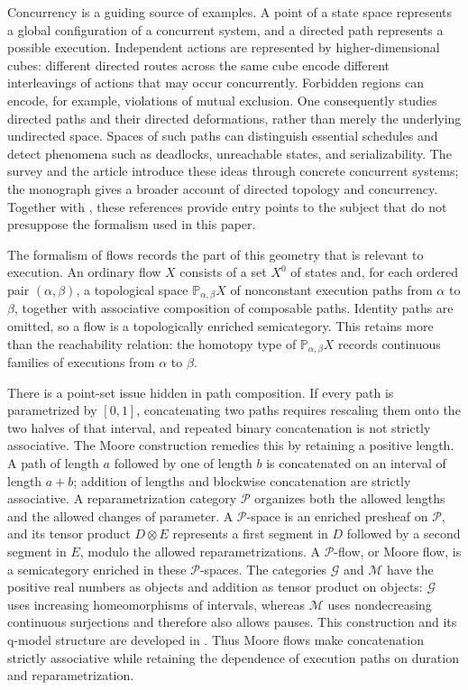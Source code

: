 \documentclass[12pt,a4paper]{amsart}
\newcommand{\Pcat}{\mathcal P}
\newcommand{\G}{\mathcal G}
\newcommand{\M}{\mathcal M}
\theoremstyle{definition}
\begin{document}
Concurrency is a guiding source of examples. A point of a state space represents a global configuration of a concurrent system, and a directed path represents a possible execution. Independent actions are represented by higher-dimensional cubes: different directed routes across the same cube encode different interleavings of actions that may occur concurrently. Forbidden regions can encode, for example, violations of mutual exclusion. One consequently studies directed paths and their directed deformations, rather than merely the underlying undirected space. Spaces of such paths can distinguish essential schedules and detect phenomena such as deadlocks, unreachable states, and serializability. The survey \cite{GoubaultUserGuide} and the article \cite{FajstrupRaussenGoubault} introduce these ideas through concrete concurrent systems; the monograph \cite{DAT_book} gives a broader account of directed topology and concurrency. Together with \cite{Grandis}, these references provide entry points to the subject that do not presuppose the formalism used in this paper.

The formalism of flows records the part of this geometry that is relevant to execution. An ordinary flow \(X\) consists of a set \(X^0\) of states and, for each ordered pair \((\alpha,\beta)\), a topological space \(\mathbb P_{\alpha,\beta}X\) of nonconstant execution paths from \(\alpha\) to \(\beta\), together with associative composition of composable paths. Identity paths are omitted, so a flow is a topologically enriched semicategory. This retains more than the reachability relation: the homotopy type of \(\mathbb P_{\alpha,\beta}X\) records continuous families of executions from \(\alpha\) to \(\beta\).

There is a point-set issue hidden in path composition. If every path is parametrized by \([0,1]\), concatenating two paths requires rescaling them onto the two halves of that interval, and repeated binary concatenation is not strictly associative. The Moore construction remedies this by retaining a positive length. A path of length \(a\) followed by one of length \(b\) is concatenated on an interval of length \(a+b\); addition of lengths and blockwise concatenation are strictly associative. A reparametrization category \(\Pcat\) organizes both the allowed lengths and the allowed changes of parameter. A \(\Pcat\)-space is an enriched presheaf on \(\Pcat\), and its tensor product \(D\otimes E\) represents a first segment in \(D\) followed by a second segment in \(E\), modulo the allowed reparametrizations. A \(\Pcat\)-flow, or Moore flow, is a semicategory enriched in these \(\Pcat\)-spaces. The categories \(\G\) and \(\M\) have the positive real numbers as objects and addition as tensor product on objects: \(\G\) uses increasing homeomorphisms of intervals, whereas \(\M\) uses nondecreasing continuous surjections and therefore also allows pauses. This construction and its q-model structure are developed in \cite[Sections~4--8]{Moore1}. Thus Moore flows make concatenation strictly associative while retaining the dependence of execution paths on duration and reparametrization.
\end{document}
